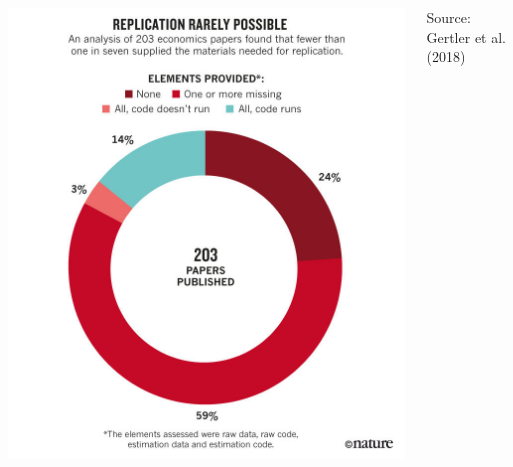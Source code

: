 \documentclass[aspectratio=169]{beamer}
\begin{document}
\usebackgroundtemplate{}
\begin{frame}
\begin{columns}
\begin{column}{0.75\textwidth}
 \href{https://www.nature.com/articles/d41586-018-02108-9}{ \includegraphics[height=\paperheight]{../Images/Gertler_Nature2.jpg}}
\end{column}
\begin{column}{0.17\textwidth}
Source: Gertler et al. (2018)
\end{column}
\end{columns}
\end{frame}
\end{document}
